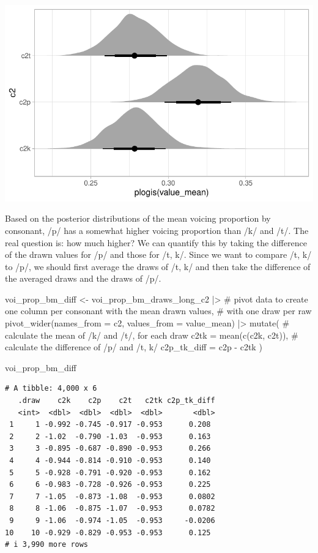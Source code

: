 \documentclass[
  authoryear,
  preprint,
  3p]{elsarticle}
\newenvironment{Shaded}{\begin{snugshade}}{\end{snugshade}}
\newcommand{\AttributeTok}[1]{\textcolor[rgb]{0.40,0.45,0.13}{#1}}
\newcommand{\CommentTok}[1]{\textcolor[rgb]{0.37,0.37,0.37}{#1}}
\newcommand{\FunctionTok}[1]{\textcolor[rgb]{0.28,0.35,0.67}{#1}}
\newcommand{\NormalTok}[1]{\textcolor[rgb]{0.00,0.23,0.31}{#1}}
\newcommand{\OtherTok}[1]{\textcolor[rgb]{0.00,0.23,0.31}{#1}}
\newcommand{\SpecialCharTok}[1]{\textcolor[rgb]{0.37,0.37,0.37}{#1}}
\begin{document}
\includegraphics{manuscript_files/figure-pdf/voi-prop-bm-draws-long-c2-1.pdf}

Based on the posterior distributions of the mean voicing proportion by
consonant, /p/ has a somewhat higher voicing proportion than /k/ and
/t/. The real question is: how much higher? We can quantify this by
taking the difference of the drawn values for /p/ and those for /t, k/.
Since we want to compare /t, k/ to /p/, we should first average the
draws of /t, k/ and then take the difference of the averaged draws and
the draws of /p/.

\begin{Shaded}
\begin{Highlighting}[]
\NormalTok{voi\_prop\_bm\_diff }\OtherTok{\textless{}{-}}\NormalTok{ voi\_prop\_bm\_draws\_long\_c2 }\SpecialCharTok{|\textgreater{}} 
  \CommentTok{\# pivot data to create one column per consonant with the mean drawn values,}
  \CommentTok{\# with one draw per raw}
  \FunctionTok{pivot\_wider}\NormalTok{(}\AttributeTok{names\_from =}\NormalTok{ c2, }\AttributeTok{values\_from =}\NormalTok{ value\_mean) }\SpecialCharTok{|\textgreater{}} 
  \FunctionTok{mutate}\NormalTok{(}
    \CommentTok{\# calculate the mean of /k/ and /t/, for each draw}
    \AttributeTok{c2tk =} \FunctionTok{mean}\NormalTok{(}\FunctionTok{c}\NormalTok{(c2k, c2t)),}
    \CommentTok{\# calculate the difference of /p/ and /t, k/}
    \AttributeTok{c2p\_tk\_diff =}\NormalTok{ c2p }\SpecialCharTok{{-}}\NormalTok{ c2tk}
\NormalTok{  )}

\NormalTok{voi\_prop\_bm\_diff}
\end{Highlighting}
\end{Shaded}

\begin{verbatim}
# A tibble: 4,000 x 6
   .draw    c2k    c2p    c2t   c2tk c2p_tk_diff
   <int>  <dbl>  <dbl>  <dbl>  <dbl>       <dbl>
 1     1 -0.992 -0.745 -0.917 -0.953      0.208 
 2     2 -1.02  -0.790 -1.03  -0.953      0.163 
 3     3 -0.895 -0.687 -0.890 -0.953      0.266 
 4     4 -0.944 -0.814 -0.910 -0.953      0.140 
 5     5 -0.928 -0.791 -0.920 -0.953      0.162 
 6     6 -0.983 -0.728 -0.926 -0.953      0.225 
 7     7 -1.05  -0.873 -1.08  -0.953      0.0802
 8     8 -1.06  -0.875 -1.07  -0.953      0.0782
 9     9 -1.06  -0.974 -1.05  -0.953     -0.0206
10    10 -0.929 -0.829 -0.953 -0.953      0.125 
# i 3,990 more rows
\end{verbatim}
\end{document}
